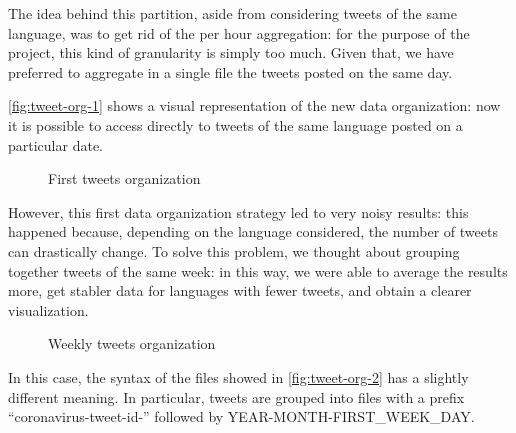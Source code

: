 The idea behind this partition, aside from considering tweets of the same language, was to get rid of the per hour aggregation: for the purpose of the project, this kind of granularity is simply too much. Given that, we have preferred to aggregate in a single file the tweets posted on the same day.

\autoref{fig:tweet-org-1} shows a visual representation of the new data organization: now it is possible to access directly to tweets of the same language posted on a particular date.

\begin{figure}[H]
	\caption{First tweets organization}
	\label{fig:tweet-org-1}
\end{figure}

However, this first data organization strategy led to very noisy results: this happened because, depending on the language considered, the number of tweets can drastically change. To solve this problem, we thought about grouping together tweets of the same week: in this way, we were able to average the results more, get stabler data for languages with fewer tweets, and obtain a clearer visualization.

\begin{figure}[H]
	\caption{Weekly tweets organization}
	\label{fig:tweet-org-2}
\end{figure}

In this case, the syntax of the files showed in \autoref{fig:tweet-org-2} has a slightly different meaning. In particular, tweets are grouped into files with a prefix “coronavirus-tweet-id-” followed by YEAR-MONTH-FIRST\_WEEK\_DAY.

